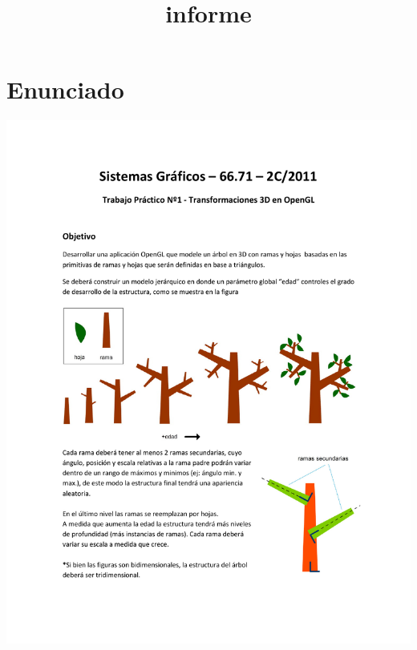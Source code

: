 \documentclass[11pt]{article}
\title{informe}
\author{}
\begin{document}


\pagestyle{fancy}
\renewcommand{\sectionmark}[1]{\markboth{}{\thesection\ \ #1}}
\lhead{}
\chead{}
\rhead{\rightmark}
\lfoot{}
\cfoot{}
\rfoot{\thepage}


\setcounter{page}{1}

\tableofcontents
\newpage


\section{Enunciado}

\begin{center}
\includegraphics[trim = 25mm 30mm 10mm 35mm, clip,height=0.93\textheight,width=1.04\textwidth]{tp1-c2-2011.pdf}

\end{center}
\end{document}
